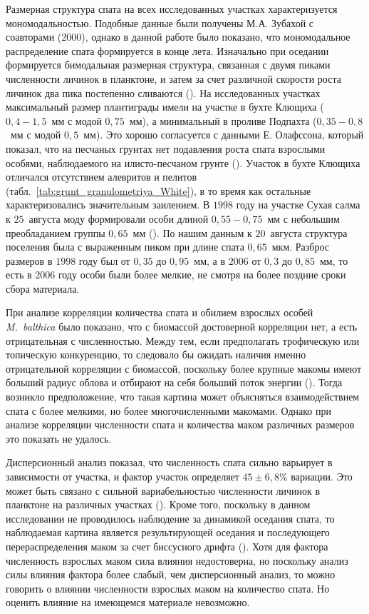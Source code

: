 Размерная структура спата на всех исследованных участках характеризуется мономодальностью. 
Подобные данные были получены М.А. Зубахой с соавторами (2000), однако в данной работе было показано, что мономодальное распределение спата формируется в конце лета. 
Изначально при оседании формируется бимодальная размерная структура, связанная с двумя пиками численности личинок в планктоне, и затем за счет различной скорости роста личинок два пика постепенно сливаются (\cite{Zubakha_et_al_2000}).
На исследованных участках максимальный размер плантиграды имели на участке в бухте Клющиха ($0,4 - 1,5$~мм с модой $0,75$~мм), а минимальный в проливе Подпахта ($0,35 - 0,8$~мм с модой $0,5$~мм). 
Это хорошо согласуется с данными Е. Олафссона, который показал, что на песчаных грунтах нет подавления роста спата взрослыми особями, наблюдаемого на илисто-песчаном грунте (\cite{Olafsson_1989}). 
Участок в бухте Клющиха отличался отсутствием алевритов и пелитов (табл.~\ref{tab:grunt_granulometriya_White}), в то время как остальные характеризовались значительным заилением. 
В $1998$ году на участке Сухая салма к $25$~августа моду формировали особи длиной $0,55 - 0,75$~мм с небольшим преобладанием группы $0,65$~мм (\cite{Zubakha_et_al_2000}). 
По нашим данным к $20$~августа структура поселения была с выраженным пиком при длине спата $0,65$~мкм. 
Разброс размеров в $1998$ году был от $0,35$ до $0,95$~мм, а в $2006$ от $0,3$ до $0,85$~мм, то есть в $2006$ году особи были более мелкие, не смотря на более поздние сроки сбора материала. 

При анализе корреляции количества спата и обилием взрослых особей \textit{M.~balthica} было показано, что с биомассой достоверной корреляции нет, а есть отрицательная с численностью. 
Между тем, если предполагать трофическую или топическую конкуренцию, то следовало бы ожидать наличия именно отрицательной корреляции с биомассой, поскольку более крупные макомы имеют больший радиус облова и отбирают на себя больший поток энергии (\cite{Olafsson_1989, Zwarts_et_al_1994}). 
Тогда возникло предположение, что такая картина может объясняться взаимодействием спата с более мелкими, но более многочисленными макомами. 
Однако при анализе корреляции численности спата и количества маком различных размеров это показать не удалось.

Дисперсионный анализ показал, что численность спата сильно варьирует в зависимости от участка, и фактор участок определяет $45 \pm 6,8$\% вариации. 
Это может быть связано с сильной вариабельностью численности личинок в планктоне на различных участках (\cite{Maximovich_Shilin_2012}). 
Кроме того, поскольку в данном исследовании не проводилось наблюдение за динамикой оседания спата, то наблюдаемая картина является результирующей оседания и последующего перераспределения маком за счет биссусного дрифта (\cite{Armonies_Hellwig-Armonies_1992, Huxham_Richards_2003}).
Хотя для фактора численность взрослых маком сила влияния недостоверна, но поскольку анализ силы влияния фактора более слабый, чем дисперсионный анализ, то можно говорить о влиянии численности взрослых маком на количество спата. Но оценить влияние на имеющемся материале невозможно.

